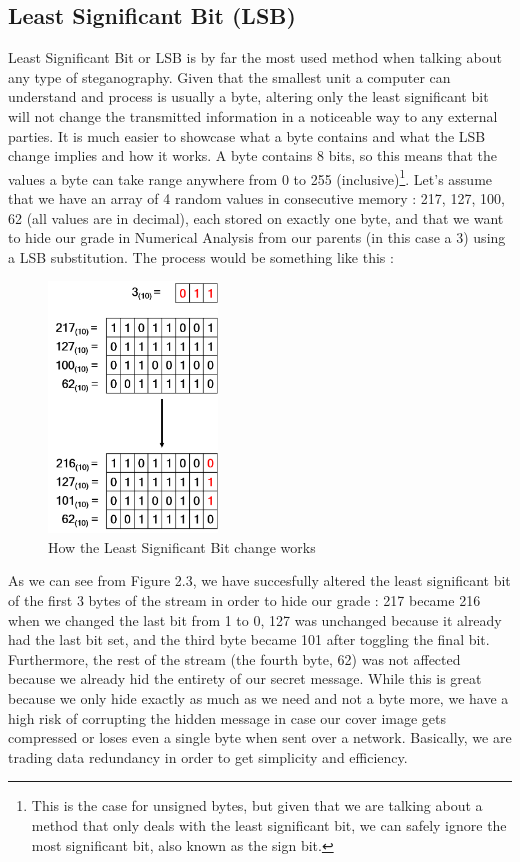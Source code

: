 \subsection{Least Significant Bit (LSB)}
\setlength\columnsep{20pt}
\begin{multicols*}{2}
Least Significant Bit or LSB is by far the most used method when talking about any type of steganography. Given that the smallest unit a computer can understand and process is usually a byte, altering only the least significant bit will not change the transmitted information in a noticeable way to any external parties. It is much easier to showcase what a byte contains and what the LSB change implies and how it works. A byte contains 8 bits, so this means that the values a byte can take range anywhere from 0 to 255 (inclusive)\footnote{This is the case for unsigned bytes, but given that we are talking about a method that only deals with the least significant bit, we can safely ignore the most significant bit, also known as the sign bit.}. Let's assume that we have an array of 4 random values in consecutive memory : 217, 127, 100, 62 (all values are in decimal), each stored on exactly one byte, and that we want to hide our grade in Numerical Analysis from our parents (in this case a 3) using a LSB substitution. The process would be something like this :

\begin{figure}[H]
    \centering
    \includegraphics[width=4.5cm,keepaspectratio]{pics/how_lsb_works}
    \caption{How the Least Significant Bit change works}
    \label{LSB}
\end{figure}

As we can see from Figure 2.3, we have succesfully altered the least significant bit of the first 3 bytes of the stream in order to hide our grade : 217 became 216 when we changed the last bit from 1 to 0, 127 was unchanged because it already had the last bit set, and the third byte became 101 after toggling the final bit. Furthermore, the rest of the stream (the fourth byte, 62) was not affected because we already hid the entirety of our secret message. While this is great because we only hide exactly as much as we need and not a byte more, we have a high risk of corrupting the hidden message in case our cover image gets compressed or loses even a single byte when sent over a network. Basically, we are trading data redundancy in order to get simplicity and efficiency.
\end{multicols*}

